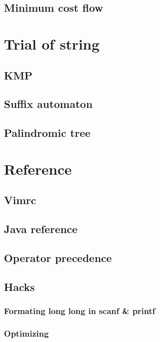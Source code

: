\documentclass[a4paper]{report}
\begin{document}
		\section{Minimum cost flow}
			
	\chapter{Trial of string}
		\section{KMP}
			
		\section{Suffix automaton}
			
		\section{Palindromic tree}
			
	\chapter{Reference}
		\section{Vimrc}
			
		\section{Java reference}
			
		\section{Operator precedence}
			
		\section{Hacks}
			\subsection{Formating long long in scanf \& printf}
				
			\subsection{Optimizing}
				
\end{document}
